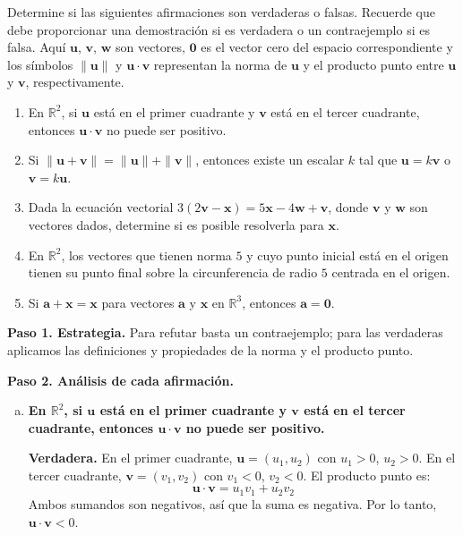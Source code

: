 \begin{prob} Determine si las siguientes afirmaciones son verdaderas o falsas. Recuerde que debe proporcionar una demostración si es verdadera o un contraejemplo si es falsa. Aquí $\mathbf{u}$, $\mathbf{v}$, $\mathbf{w}$ son vectores, $\mathbf{0}$ es el vector cero del espacio correspondiente y los símbolos $\|\mathbf{u}\|$ y $\mathbf{u} \cdot \mathbf{v}$ representan la norma de $\mathbf{u}$ y el producto punto entre $\mathbf{u}$ y $\mathbf{v}$, respectivamente.
\begin{enumerate}[$a)$]
 \item En $\mathbb{R}^2$, si $\mathbf{u}$ está en el primer cuadrante y $\mathbf{v}$ está en el tercer cuadrante, entonces $\mathbf{u} \cdot \mathbf{v}$ no puede ser positivo.
\item Si $\|\mathbf{u}+\mathbf{v}\|=\|\mathbf{u}\|+\|\mathbf{v}\|$, entonces existe un escalar $k$ tal que $\mathbf{u}=k\mathbf{v}$ o $\mathbf{v}=k\mathbf{u}$.
\item Dada la ecuación vectorial $3(2\mathbf{v}-\mathbf{x})=5\mathbf{x}-4\mathbf{w}+\mathbf{v}$, donde $\mathbf{v}$ y $\mathbf{w}$ son vectores dados, determine si es posible resolverla para $\mathbf{x}$.
\item En $\mathbb{R}^2$, los vectores que tienen norma $5$ y cuyo punto inicial está en el origen tienen su punto final sobre la circunferencia de radio $5$ centrada en el origen.
\item Si $\mathbf{a}+\mathbf{x}=\mathbf{x}$ para vectores $\mathbf{a}$ y $\mathbf{x}$ en $\mathbb{R}^3$, entonces $\mathbf{a}=\mathbf{0}$.
\end{enumerate}
\begin{myproof}
\textbf{Paso 1. Estrategia.} Para refutar basta un contraejemplo; para las verdaderas aplicamos las definiciones y propiedades de la norma y el producto punto.

\textbf{Paso 2. Análisis de cada afirmación.}
\begin{enumerate}[a)]
\item \textbf{En $\mathbb{R}^2$, si $\mathbf{u}$ está en el primer cuadrante y $\mathbf{v}$ está en el tercer cuadrante, entonces $\mathbf{u} \cdot \mathbf{v}$ no puede ser positivo.}

\textbf{Verdadera.}  
En el primer cuadrante, $\mathbf{u} = (u_1, u_2)$ con $u_1 > 0$, $u_2 > 0$.  
En el tercer cuadrante, $\mathbf{v} = (v_1, v_2)$ con $v_1 < 0$, $v_2 < 0$.  
El producto punto es:
\[
\mathbf{u} \cdot \mathbf{v} = u_1 v_1 + u_2 v_2
\]
Ambos sumandos son negativos, así que la suma es negativa.  
Por lo tanto, $\mathbf{u} \cdot \mathbf{v} < 0$.



\end{enumerate}
\end{myproof}
\end{prob}
